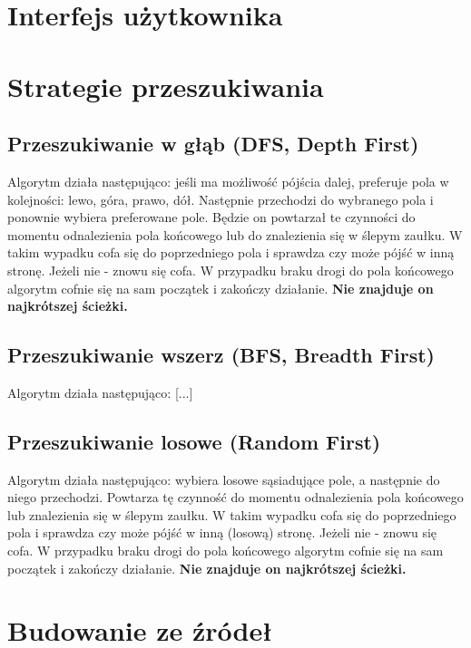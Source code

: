 \documentclass[12pt,a4paper]{article}
\begin{document}
	\section{Interfejs użytkownika}
	
	\section{Strategie przeszukiwania}
	\subsection{Przeszukiwanie w głąb (DFS, Depth First)}
	Algorytm działa następująco: jeśli ma możliwość pójścia dalej,
	preferuje pola w kolejności: lewo, góra, prawo, dół. Następnie 
	przechodzi do wybranego pola i ponownie wybiera preferowane pole. 
	Będzie on powtarzał te czynności do momentu odnalezienia 
	pola końcowego lub do znalezienia się w ślepym zaułku. W takim	
	wypadku cofa się do poprzedniego pola i sprawdza czy może pójść w 
	inną stronę. Jeżeli nie - znowu się cofa. W przypadku braku
	drogi do pola końcowego algorytm cofnie się na sam początek i
	zakończy działanie. \textbf{Nie znajduje on najkrótszej ścieżki.}
	
	\subsection{Przeszukiwanie wszerz (BFS, Breadth First)}
	Algorytm działa następująco: [...]
	
	\subsection{Przeszukiwanie losowe (Random First)}
	Algorytm działa następująco: wybiera losowe sąsiadujące pole, a
	następnie do niego przechodzi. Powtarza tę czynność do momentu
	odnalezienia pola końcowego lub znalezienia się w ślepym zaułku. W 
	takim wypadku cofa się do poprzedniego pola i sprawdza czy może
	pójść w inną (losową) stronę. Jeżeli nie - znowu się cofa. W 
	przypadku braku drogi do pola końcowego algorytm cofnie się na sam 
	początek i zakończy działanie. \textbf{Nie znajduje on najkrótszej 
	ścieżki.}
	
	\section{Budowanie ze źródeł}
\end{document}
